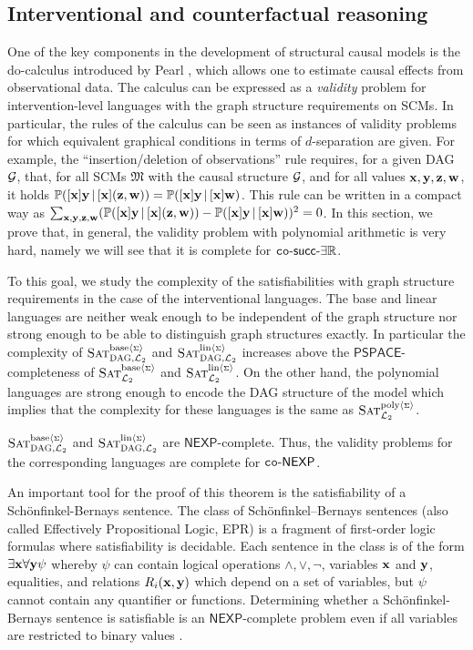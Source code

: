 \documentclass[a4paper,UKenglish,cleveref, autoref, thm-restate]{lipics-v2021}
\newcommand{\IR}{\mathbb{R}}
\newcommand{\compactEquals}[1]{\let\IsInPP=1#1\let\IsInPP=\relax}
\newcommand{\PP}[1]{\mathbb{P}(\compactEquals{#1})}
\newcommand{\succR}{\ensuremath{\mathsf{succ\text{-}\exists\IR}}}
\newcommand{\NEXP}{\ensuremath{\mathsf{NEXP}}}
\newcommand{\PSPACE}{\ensuremath{\mathsf{PSPACE}}}
\newcommand{\fM}{{\mathfrak M}}
\newcommand{\cG}{{\cal G}}
\newcommand{\bw}{{\bf w}}
\newcommand{\by}{{\bf y}}
\newcommand{\bx}{{\bf x}}
\newcommand{\bz}{{\bf z}}
\def\probsumname#1#2{^{\text{#1}{\langle{\scriptscriptstyle\Sigma}\rangle}}_{\text{#2}}}
\def\probsumgraphname#1#2{^{\text{#1}{\langle{\scriptscriptstyle\Sigma}\rangle}}_{\mbox{\scriptsize\sc DAG}, \text{#2}}}
\newcommand{\SATinterventcompsumgraph}{\mbox{\sc Sat}\probsumgraphname{base}{${\cal L}_2$}}
\newcommand{\SATinterventlinsumgraph}{\mbox{\sc Sat}\probsumgraphname{lin}{${\cal L}_2$}}
\newcommand{\SATinterventcompsum}{\mbox{\sc Sat}\probsumname{base}{${\cal L}_2$}}
\newcommand{\SATinterventlinsum}{\mbox{\sc Sat}\probsumname{lin}{${\cal L}_2$}}
\newcommand{\SATinterventpolysum}{\mbox{\sc Sat}\probsumname{poly}{${\cal L}_2$}}
\begin{document}
\subsection{Interventional and counterfactual reasoning}\label{sec:given:DAG:structure:L2-3}
One of the key components in the development of structural causal models is the 
do-calculus introduced by Pearl \cite{pearl1995causal,Pearl2009}, which allows one 
to estimate causal effects from observational data. The calculus can be expressed
as a \emph{validity} problem for intervention-level languages with the graph structure 
requirements on SCMs. In particular, the rules of the calculus can be seen as 
instances of validity problems for which equivalent graphical conditions in terms 
of $d$-separation are given. For example, the ``insertion/deletion of observations''
rule requires, for a given DAG $\cG$, that, for all SCMs $\fM$ with the causal structure $\cG$,
and for all values $\bx,\by,\bz,\bw$, it holds
$\PP{[\bx]\by \, |\, [\bx](\bz,\bw)}=\PP{[\bx]\by \, |\, [\bx]\bw}$. This rule can be written in a compact way as
$\sum_{\bx,\by,\bz,\bw}(\PP{[\bx]\by \, |\, [\bx](\bz,\bw)}-\PP{[\bx]\by \, |\, [\bx]\bw})^2=0$.
In this section, we prove that, in general, the validity problem with polynomial arithmetic is very hard, namely we will see
that it is complete for ${\tt co}\mbox{-}\succR$.


To this goal, we study the complexity of the satisfiabilities with graph structure 
requirements in the case of the interventional languages.
The base and linear languages are neither weak enough to be independent of the graph structure 
nor strong enough to be able to distinguish graph structures exactly.
In particular the complexity of $\SATinterventcompsumgraph$ and $\SATinterventlinsumgraph$ 
increases above the $\PSPACE$-completeness of $\SATinterventcompsum$ and $\SATinterventlinsum$.
On the other hand, the polynomial languages are strong enough to encode the DAG structure 
of the model which implies that the complexity for these languages is the same 
as $\SATinterventpolysum$.
\begin{theorem}\label{thm:SATinterventcompsumgraph:ccNEXP-complete}
    $\SATinterventcompsumgraph$ and $\SATinterventlinsumgraph$ are $\NEXP$-complete. Thus,
    the validity problems for the corresponding languages are complete for
     ${\tt co}\mbox{-}\NEXP$.
\end{theorem}
An important tool for the proof of this theorem is the satisfiability of a Sch\"{o}nfinkel-Bernays sentence.
The class of Sch\"{o}nfinkel--Bernays  sentences (also called Effectively Propositional Logic, EPR) is a fragment of first-order logic formulas where satisfiability is decidable. Each  sentence in the class is of the form $\exists \bx  \forall \by \psi$ whereby $\psi$ can contain logical operations $\wedge, \vee, \neg$, variables $\bx$ and $\by$, equalities, and relations $R_i(\bx,\by)$ which depend on a set of variables, but $\psi$ cannot contain any quantifier or functions. Determining whether a Sch\"{o}nfinkel-Bernays sentence is satisfiable is an $\NEXP$-complete problem \cite{schoenfinkelLogicNEXPLewis1980} even if all variables are restricted to binary values \cite{schoenfinkelLogicBinaryNEXP2015}.
\end{document}
